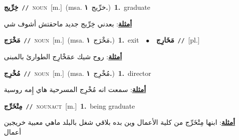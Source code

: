 \documentclass[10pt,a4paper,twoside]{article} %
\begin{document}
\begin{multicols}{2}
{\setlength\topsep{0pt}\textbf{\foreignlanguage{arabic}{خِرِّيج}}\ {\color{gray}\texttt{//}\color{black}}\ \textsc{noun}\ [m.]\ \color{gray}(msa. \foreignlanguage{arabic}{خرِّيج}~\foreignlanguage{arabic}{\textbf{١.}})\color{black}\ \textbf{1.}~graduate\  \begin{flushright}\color{gray}\foreignlanguage{arabic}{\textbf{\underline{\foreignlanguage{arabic}{أمثلة}}}: بعدني خِرِّيج جديد ماحقتش أشوف شي}\end{flushright}\color{black}} \vspace{2mm}

{\setlength\topsep{0pt}\textbf{\foreignlanguage{arabic}{مَخْرَج}}\ {\color{gray}\texttt{//}\color{black}}\ \textsc{noun}\ [m.]\ \color{gray}(msa. \foreignlanguage{arabic}{مَخْرَج}~\foreignlanguage{arabic}{\textbf{١.}})\color{black}\ \textbf{1.}~exit\ \ $\bullet$\ \ \setlength\topsep{0pt}\textbf{\foreignlanguage{arabic}{مَخَارِج}}\ {\color{gray}\texttt{//}\color{black}}\ [pl.]\  \begin{flushright}\color{gray}\foreignlanguage{arabic}{\textbf{\underline{\foreignlanguage{arabic}{أمثلة}}}: روح شيك عمَخْارِج الطوارئ بالمبنى}\end{flushright}\color{black}} \vspace{2mm}

{\setlength\topsep{0pt}\textbf{\foreignlanguage{arabic}{مُخْرِج}}\ {\color{gray}\texttt{//}\color{black}}\ \textsc{noun}\ [m.]\ \color{gray}(msa. \foreignlanguage{arabic}{مُخْرِج}~\foreignlanguage{arabic}{\textbf{١.}})\color{black}\ \textbf{1.}~director\  \begin{flushright}\color{gray}\foreignlanguage{arabic}{\textbf{\underline{\foreignlanguage{arabic}{أمثلة}}}: سمعت انه مُخْرِج المسرحية هاي إِمه روسية}\end{flushright}\color{black}} \vspace{2mm}

{\setlength\topsep{0pt}\textbf{\foreignlanguage{arabic}{مِتْخَرِّج}}\ {\color{gray}\texttt{//}\color{black}}\ \textsc{noun\textunderscore act}\ [m.]\ \textbf{1.}~being graduate\  \begin{flushright}\color{gray}\foreignlanguage{arabic}{\textbf{\underline{\foreignlanguage{arabic}{أمثلة}}}: ابنها مِتْخَرِّج من كلية الأعمال وين بده بلاقي شغل بالبلد ماهي معبية خريجين أعمال}\end{flushright}\color{black}} \vspace{2mm}


\end{multicols}
\end{document}
